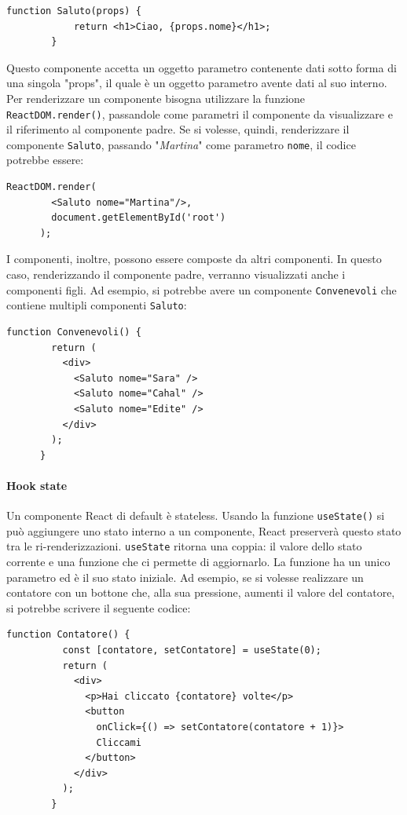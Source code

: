 \documentclass[a4paper]{article}
\begin{document}
    \begin{lstlisting}[style=ES6, title={Esempio componente}]
        function Saluto(props) {
            return <h1>Ciao, {props.nome}</h1>;
        }\end{lstlisting}

    Questo componente accetta un oggetto parametro contenente dati sotto forma di una singola
    "props", il quale è un oggetto parametro avente dati al suo interno.
    Per renderizzare un componente bisogna utilizzare la funzione \verb|ReactDOM.render()|,
    passandole come parametri il componente da visualizzare e il riferimento al componente padre.
    Se si volesse, quindi, renderizzare il componente \verb|Saluto|, passando "\emph{Martina}" come parametro \verb|nome|, il codice potrebbe essere:
    
    \begin{lstlisting}[style=ES6, title={Esempio composizione di componenti}]
      ReactDOM.render(
        <Saluto nome="Martina"/>, 
        document.getElementById('root')
      );\end{lstlisting}
    
    I componenti, inoltre, possono essere composte da altri componenti. In questo caso,
    renderizzando il componente padre, verranno visualizzati anche i componenti figli. Ad esempio, 
    si potrebbe avere un componente \verb|Convenevoli| che contiene multipli componenti \verb|Saluto|:
    \begin{lstlisting}[style=ES6, title={Esempio renderizzazione componente}]
      function Convenevoli() {
        return (
          <div>
            <Saluto nome="Sara" />
            <Saluto nome="Cahal" />
            <Saluto nome="Edite" />
          </div>
        );
      }\end{lstlisting}

      \paragraph{Hook state}
      Un componente React di default è stateless. Usando la funzione \verb|useState()| si può
      aggiungere uno stato interno a un componente, React preserverà questo stato tra le ri-renderizzazioni.
      \verb|useState| ritorna una coppia: il valore dello stato corrente e una funzione che ci permette di aggiornarlo.
      La funzione ha un unico parametro ed è il suo stato iniziale. Ad esempio, se si volesse realizzare un contatore con un bottone che, alla sua pressione,
      aumenti il valore del contatore, si potrebbe scrivere il seguente codice:
      \begin{lstlisting}[style=ES6, title={Esempio contatore con stato interno}]
        function Contatore() {
          const [contatore, setContatore] = useState(0);
          return (
            <div>
              <p>Hai cliccato {contatore} volte</p>
              <button 
                onClick={() => setContatore(contatore + 1)}>
                Cliccami
              </button>
            </div>
          );
        }\end{lstlisting}
\end{document}
